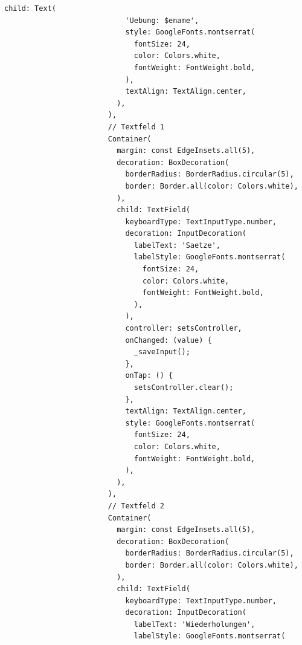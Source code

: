 \begin{lstlisting}[caption=Bearbeiten Build,label=lst:impl:frontend:qrcode]
                          child: Text(
                            'Uebung: $ename',
                            style: GoogleFonts.montserrat(
                              fontSize: 24,
                              color: Colors.white,
                              fontWeight: FontWeight.bold,
                            ),
                            textAlign: TextAlign.center,
                          ),
                        ),
                        // Textfeld 1
                        Container(
                          margin: const EdgeInsets.all(5),
                          decoration: BoxDecoration(
                            borderRadius: BorderRadius.circular(5),
                            border: Border.all(color: Colors.white),
                          ),
                          child: TextField(
                            keyboardType: TextInputType.number,
                            decoration: InputDecoration(
                              labelText: 'Saetze',
                              labelStyle: GoogleFonts.montserrat(
                                fontSize: 24,
                                color: Colors.white,
                                fontWeight: FontWeight.bold,
                              ),
                            ),
                            controller: setsController,
                            onChanged: (value) {
                              _saveInput();
                            },
                            onTap: () {
                              setsController.clear();
                            },
                            textAlign: TextAlign.center,
                            style: GoogleFonts.montserrat(
                              fontSize: 24,
                              color: Colors.white,
                              fontWeight: FontWeight.bold,
                            ),
                          ),
                        ),
                        // Textfeld 2
                        Container(
                          margin: const EdgeInsets.all(5),
                          decoration: BoxDecoration(
                            borderRadius: BorderRadius.circular(5),
                            border: Border.all(color: Colors.white),
                          ),
                          child: TextField(
                            keyboardType: TextInputType.number,
                            decoration: InputDecoration(
                              labelText: 'Wiederholungen',
                              labelStyle: GoogleFonts.montserrat(

\end{lstlisting}
